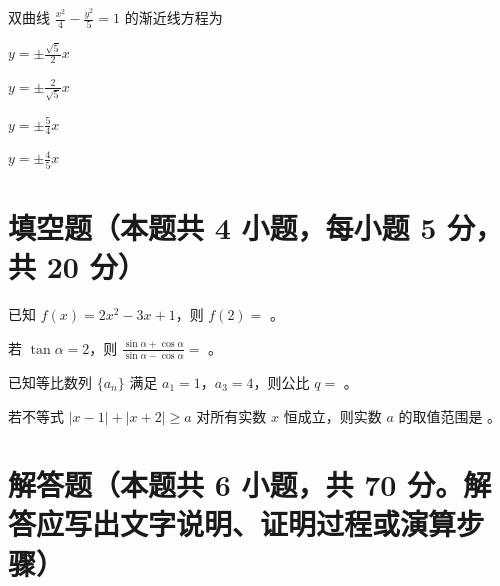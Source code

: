 \documentclass{exam-zh}
\begin{document}
\begin{question}
  双曲线 $\frac{x^2}{4} - \frac{y^2}{5} = 1$ 的渐近线方程为\paren[A]
  \begin{choices}
    \item $y = \pm \frac{\sqrt{5}}{2}x$
    \item $y = \pm \frac{2}{\sqrt{5}}x$
    \item $y = \pm \frac{5}{4}x$
    \item $y = \pm \frac{4}{5}x$
  \end{choices}
\end{question}


\section{填空题（本题共 4 小题，每小题 5 分，共 20 分）}

\begin{question}
  已知 $f(x) = 2x^2 - 3x + 1$，则 $f(2) = $ \fillin[3]。
\end{question}

\begin{question}
  若 $\tan \alpha = 2$，则 $\frac{\sin \alpha + \cos \alpha}{\sin \alpha - \cos \alpha} = $ \fillin[3]。
\end{question}

\begin{question}
  已知等比数列 $\{a_n\}$ 满足 $a_1 = 1$，$a_3 = 4$，则公比 $q = $ \fillin[{$\pm 2$}]。
\end{question}

\begin{question}
  若不等式 $|x - 1| + |x + 2| \geq a$ 对所有实数 $x$ 恒成立，则实数 $a$ 的取值范围是 \fillin[{$(-\infty, 3]$}]。
\end{question}


\section{解答题（本题共 6 小题，共 70 分。解答应写出文字说明、证明过程或演算步骤）}
\end{document}
